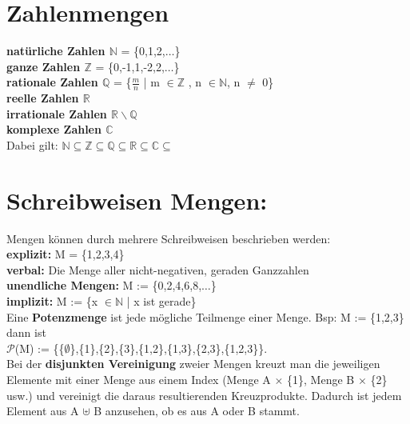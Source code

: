 \section*{Zahlenmengen}
\vspace{-0.3cm}
\textbf{natürliche Zahlen $\mathbb{N}$} = \{0,1,2,$\dots$\}\\
\textbf{ganze Zahlen $\mathbb{Z}$} = \{0,-1,1,-2,2,$\dots$\}\\
\textbf{rationale Zahlen $\mathbb{Q}$} = \{$\frac{m}{n}$ | m $\in \mathbb{Z}$ , n $\in \mathbb{N}$, n $\neq$ 0\}\\
\textbf{reelle Zahlen $\mathbb{R}$}\\
\textbf{irrationale Zahlen $\mathbb{R}\backslash\mathbb{Q}$ }\\
\textbf{komplexe Zahlen $\mathbb{C}$}\\

Dabei gilt: $\mathbb{N} \subseteq \mathbb{Z} \subseteq \mathbb{Q} \subseteq \mathbb{R} \subseteq \mathbb{C} \subseteq$

\section*{Schreibweisen Mengen:}
\vspace{-0.3cm}
Mengen können durch mehrere Schreibweisen beschrieben werden:\\
\textbf{explizit:} M = \{1,2,3,4\}\\
\textbf{verbal:} \glqq Die Menge aller nicht-negativen, geraden Ganzzahlen\grqq\\
\textbf{unendliche Mengen:} M := \{0,2,4,6,8,$\dots$\}\\
\textbf{implizit:} M := \{x $\in \mathbb{N}$ | x ist gerade\}\\

Eine \textbf{Potenzmenge} ist jede mögliche Teilmenge einer Menge. Bsp: M := \{1,2,3\} dann ist \\
$\mathcal{P}$(M) := \{\{$\emptyset$\},\{1\},\{2\},\{3\},\{1,2\},\{1,3\},\{2,3\},\{1,2,3\}\}.\\

Bei der \textbf{disjunkten Vereinigung} zweier Mengen kreuzt man die jeweiligen Elemente mit einer Menge aus einem Index (Menge A $\times$ \{1\}, Menge B $\times$ \{2\} usw.) und vereinigt die daraus resultierenden Kreuzprodukte. Dadurch ist jedem Element aus A $\uplus$ B anzusehen, ob es aus A oder B stammt.\\
